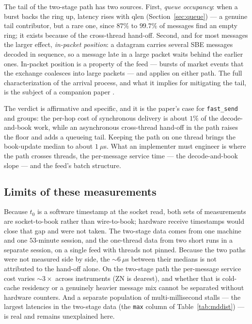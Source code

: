 \documentclass[11pt]{article}
\newcommand{\fs}{\texttt{fast\_send}}
\begin{document}
The tail of the two-stage path has two sources. First, \emph{queue occupancy}: when a burst
backs the ring up, latency rises with $\text{qlen}$ (Section~\ref{sec:queue})
--- a genuine tail contributor, but a rare one, since $87\%$ to $99.7\%$ of
messages find an empty ring; it exists because of the cross-thread hand-off.
Second, and for most messages the larger effect, \emph{in-packet position}: a
datagram carries several SBE messages decoded in sequence, so a message late in a
large packet waits behind the earlier ones. In-packet position is a property of
the feed --- bursts of market events that the exchange coalesces into large
packets --- and applies on either path. The full characterization of
the arrival process, and what it implies for mitigating the tail, is the subject
of a companion paper \cite{mdarrival}.

The verdict is affirmative and specific, and it is the paper's case for \fs{}
and groups: the per-hop cost of synchronous delivery is about $1\%$ of the
decode-and-book work, while an asynchronous cross-thread hand-off in the path
raises the floor and adds a queueing tail. Keeping the path on one thread brings
the book-update median to about $1~\mu$s. What an implementer must engineer is
where the path crosses threads, the per-message service time --- the
decode-and-book slope --- and the feed's batch structure.

\subsection{Limits of these measurements}

Because $t_0$ is a software timestamp at the socket read, both sets of
measurements are socket-to-book rather than wire-to-book; hardware receive
timestamps would close that gap and were not taken. The two-stage data comes
from one machine and one $53$-minute session, and the one-thread data from two
short runs in a separate session, on a single feed with threads not pinned.
Because the two paths were not measured side by side, the $\sim\!6~\mu$s between
their medians is not attributed to the hand-off alone. On the two-stage path the
per-message service cost varies $\sim\!3\times$
across instruments (ZN is dearest), and whether that is cold-cache residency or a
genuinely heavier message mix cannot be separated without hardware counters. And a
separate population of multi-millisecond stalls --- the largest latencies in the
two-stage data (the \texttt{max} column of Table~\ref{tab:mddist}) --- is real and
remains unexplained here.
\end{document}
